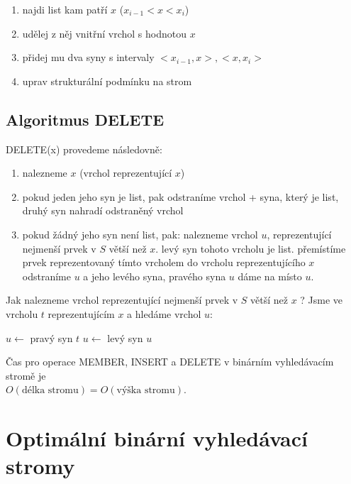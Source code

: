 \begin{enumerate}
  \item najdi list kam patří $x$ ($x_{i-1} < x < x_i$)
  \item udělej z něj vnitřní vrchol s hodnotou $x$
  \item přidej mu dva syny s intervaly $<x_{i-1}, x> , <x, x_i>$
  \item uprav strukturální podmínku na strom
\end{enumerate}


\subsection{Algoritmus DELETE}

DELETE(x) provedeme následovně: 

\begin{enumerate}
  \item nalezneme $x$ (vrchol reprezentující $x$)
  \item pokud jeden jeho syn je list, pak odstraníme vrchol + syna, který je
    list, druhý syn nahradí odstraněný vrchol
  \item pokud žádný jeho syn není list, pak:
    nalezneme vrchol $u$, reprezentující nejmenší prvek v $S$ větší než $x$.
    levý syn tohoto vrcholu je list.
    přemístíme prvek reprezentovaný tímto vrcholem do vrcholu
    reprezentujícího $x$ odstraníme $u$ a jeho levého syna, pravého syna
    $u$ dáme na místo $u$.
\end{enumerate}

Jak nalezneme vrchol reprezentující nejmenší prvek v $S$ větší než $x$ ?
Jsme ve vrcholu $t$ reprezentujícím $x$ a hledáme vrchol $u$:
\begin{algorithmic}
\STATE $u \leftarrow$ pravý syn $t$
   \STATE $u \leftarrow$ levý syn $u$
\ENDWHILE
\end{algorithmic}

Čas pro operace MEMBER, INSERT a DELETE v binárním vyhledávacím stromě je
\\
$O(\text{délka stromu}) = O(\text{výška stromu})$.

\section{Optimální binární vyhledávací stromy}

